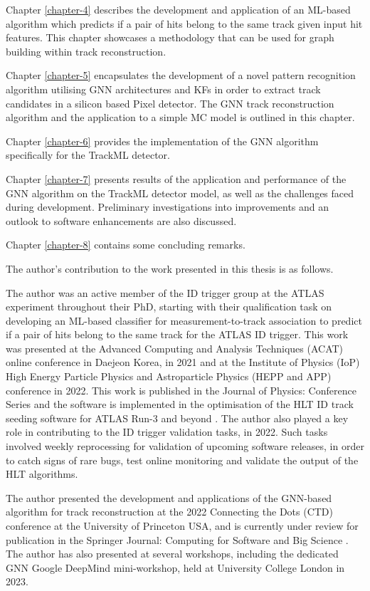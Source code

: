 Chapter \ref{chapter-4} describes the development and application of an ML-based algorithm which predicts if a pair of hits belong to the same track given input hit features. This chapter showcases a methodology that can be used for graph building within track reconstruction.

Chapter \ref{chapter-5} encapsulates the development of a novel pattern recognition algorithm utilising \acs{GNN} architectures and \ac{KF}s in order to extract track candidates in a silicon based Pixel detector. The \acs{GNN} track reconstruction algorithm and the application to a simple \ac{MC} model is outlined in this chapter.

Chapter \ref{chapter-6} provides the implementation of the \acs{GNN} algorithm specifically for the TrackML detector.

Chapter \ref{chapter-7} presents results of the application and performance of the \acs{GNN} algorithm on the TrackML detector model, as well as the challenges faced during development. Preliminary investigations into improvements and an outlook to software enhancements are also discussed.

Chapter \ref{chapter-8} contains some concluding remarks.

The author’s contribution to the work presented in this thesis is as follows.

The author was an active member of the \ac{ID} trigger group at the ATLAS experiment throughout their PhD, starting with their qualification task on developing an ML-based classifier for measurement-to-track association to predict if a pair of hits belong to the same track for the ATLAS ID trigger. This work was presented at the Advanced Computing and Analysis Techniques (ACAT) online conference in Daejeon Korea, in 2021 and at the Institute of Physics (IoP) High Energy Particle Physics and Astroparticle Physics (HEPP and APP) conference in 2022. This work is published in the Journal of Physics: Conference Series \cite{Lad_2023} and the software is implemented in the optimisation of the \ac{HLT} ID track seeding software for ATLAS Run-3 and beyond \cite{Grandi:2728111, Long:2813981}. The author also played a key role in contributing to the ID trigger validation tasks, in 2022. Such tasks involved weekly reprocessing for validation of upcoming software releases, in order to catch signs of rare bugs, test online monitoring and validate the output of the \ac{HLT} algorithms.

The author presented the development and applications of the GNN-based algorithm for track reconstruction at the 2022 Connecting the Dots (CTD) conference at the University of Princeton USA, and is currently under review for publication in the Springer Journal: Computing for Software and Big Science \cite{Lad_2023_gnn}. The author has also presented at several workshops, including the dedicated \acs{GNN} Google DeepMind mini-workshop, held at University College London in 2023.

